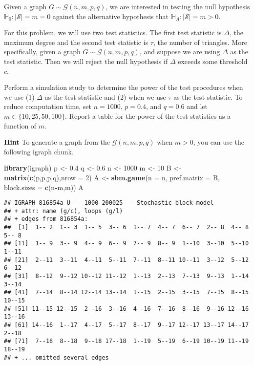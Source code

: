 \documentclass[
]{article}
\newenvironment{Shaded}{\begin{snugshade}}{\end{snugshade}}
\newcommand{\DataTypeTok}[1]{\textcolor[rgb]{0.13,0.29,0.53}{#1}}
\newcommand{\DecValTok}[1]{\textcolor[rgb]{0.00,0.00,0.81}{#1}}
\newcommand{\FloatTok}[1]{\textcolor[rgb]{0.00,0.00,0.81}{#1}}
\newcommand{\KeywordTok}[1]{\textcolor[rgb]{0.13,0.29,0.53}{\textbf{#1}}}
\newcommand{\NormalTok}[1]{#1}
\newcommand{\OperatorTok}[1]{\textcolor[rgb]{0.81,0.36,0.00}{\textbf{#1}}}
\newcommand{\StringTok}[1]{\textcolor[rgb]{0.31,0.60,0.02}{#1}}
\begin{document}
Given a graph \(G \sim \mathcal{G}(n,m,p,q)\), we are interested in
testing the null hypothesis
\(\mathbb{H}_0 \colon |\mathcal{S}| = m = 0\) against the alternative
hypothesis that \(\mathbb{H}_A \colon |\mathcal{S}| = m > 0\).

For this problem, we will use two test statistics. The first test
statistic is \(\Delta\), the maximum degree and the second test
statistic is \(\tau\), the number of triangles. More specifically, given
a graph \(G \sim \mathcal{G}(n,m,p,q)\), and suppose we are using
\(\Delta\) as the test statistic. Then we will reject the null
hypothesis if \(\Delta\) exceeds some threshold \(c\).

Perform a simulation study to determine the power of the test procedures
when we use (1) \(\Delta\) as the test statistic and (2) when we use
\(\tau\) as the test statistic. To reduce computation time, set
\(n = 1000\), \(p = 0.4\), and \(q = 0.6\) and let
\(m \in \{10,25,50,100\}\). Report a table for the power of the test
statistics as a function of \(m\).

\textbf{Hint} To generate a graph from the \(\mathcal{G}(n,m,p,q)\) when
\(m > 0\), you can use the following igraph chunk.

\begin{Shaded}
\begin{Highlighting}[]
\KeywordTok{library}\NormalTok{(igraph)}
\NormalTok{p <-}\StringTok{ }\FloatTok{0.4}
\NormalTok{q <-}\StringTok{ }\FloatTok{0.6}
\NormalTok{n <-}\StringTok{ }\DecValTok{1000}
\NormalTok{m <-}\StringTok{ }\DecValTok{10}
\NormalTok{B <-}\StringTok{ }\KeywordTok{matrix}\NormalTok{(}\KeywordTok{c}\NormalTok{(p,p,p,q),}\DataTypeTok{nrow =} \DecValTok{2}\NormalTok{)}
\NormalTok{A <-}\StringTok{ }\KeywordTok{sbm.game}\NormalTok{(}\DataTypeTok{n =}\NormalTok{ n, }\DataTypeTok{pref.matrix =}\NormalTok{ B, }\DataTypeTok{block.sizes =} \KeywordTok{c}\NormalTok{(n}\OperatorTok{-}\NormalTok{m,m))}
\NormalTok{A}
\end{Highlighting}
\end{Shaded}

\begin{verbatim}
## IGRAPH 816854a U--- 1000 200025 -- Stochastic block-model
## + attr: name (g/c), loops (g/l)
## + edges from 816854a:
##  [1]  1-- 2  1-- 3  1-- 5  3-- 6  1-- 7  4-- 7  6-- 7  2-- 8  4-- 8  5-- 8
## [11]  1-- 9  3-- 9  4-- 9  6-- 9  7-- 9  8-- 9  1--10  3--10  5--10  1--11
## [21]  2--11  3--11  4--11  5--11  7--11  8--11 10--11  3--12  5--12  6--12
## [31]  8--12  9--12 10--12 11--12  1--13  2--13  7--13  9--13  1--14  3--14
## [41]  7--14  8--14 12--14 13--14  1--15  2--15  3--15  7--15  8--15 10--15
## [51] 11--15 12--15  2--16  3--16  4--16  7--16  8--16  9--16 12--16 13--16
## [61] 14--16  1--17  4--17  5--17  8--17  9--17 12--17 13--17 14--17  2--18
## [71]  7--18  8--18  9--18 17--18  1--19  5--19  6--19 10--19 11--19 18--19
## + ... omitted several edges
\end{verbatim}
\end{document}
